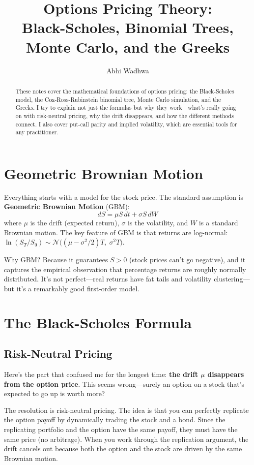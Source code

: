 \documentclass[11pt]{article}
\title{Options Pricing Theory:\\Black-Scholes, Binomial Trees, Monte Carlo, and the Greeks}
\author{Abhi Wadhwa}
\date{}
\begin{document}
\maketitle

\begin{abstract}
These notes cover the mathematical foundations of options pricing: the Black-Scholes model, the Cox-Ross-Rubinstein binomial tree, Monte Carlo simulation, and the Greeks. I try to explain not just the formulas but why they work---what's really going on with risk-neutral pricing, why the drift disappears, and how the different methods connect. I also cover put-call parity and implied volatility, which are essential tools for any practitioner.
\end{abstract}

\section{Geometric Brownian Motion}

Everything starts with a model for the stock price. The standard assumption is \textbf{Geometric Brownian Motion} (GBM):
\[
dS = \mu S \, dt + \sigma S \, dW
\]
where $\mu$ is the drift (expected return), $\sigma$ is the volatility, and $W$ is a standard Brownian motion. The key feature of GBM is that returns are log-normal: $\ln(S_T/S_0) \sim \mathcal{N}\big((\mu - \sigma^2/2)T,\; \sigma^2 T\big)$.

Why GBM? Because it guarantees $S > 0$ (stock prices can't go negative), and it captures the empirical observation that percentage returns are roughly normally distributed. It's not perfect---real returns have fat tails and volatility clustering---but it's a remarkably good first-order model.

\section{The Black-Scholes Formula}

\subsection{Risk-Neutral Pricing}

Here's the part that confused me for the longest time: \textbf{the drift $\mu$ disappears from the option price}. This seems wrong---surely an option on a stock that's expected to go up is worth more?

The resolution is risk-neutral pricing. The idea is that you can perfectly replicate the option payoff by dynamically trading the stock and a bond. Since the replicating portfolio and the option have the same payoff, they must have the same price (no arbitrage). When you work through the replication argument, the drift cancels out because both the option and the stock are driven by the same Brownian motion.
\end{document}
